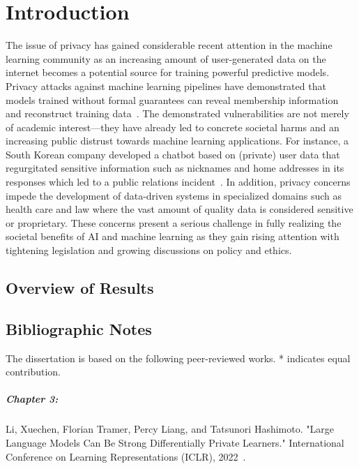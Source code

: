 \chapter{Introduction}

The issue of privacy has gained considerable recent attention in the machine learning community as an increasing amount of user-generated data on the internet becomes a potential source for training powerful predictive models.
Privacy attacks against machine learning pipelines have demonstrated that models trained without formal guarantees can reveal membership information and reconstruct training data~\cite{shokri2017membership,carlini2021extracting}.
The demonstrated vulnerabilities are not merely of academic interest---they have already led to concrete societal harms and an increasing public distrust towards machine learning applications.
For instance, a South Korean company developed a chatbot based on (private) user data that regurgitated sensitive information such as nicknames and home addresses in its responses which led to a public relations incident~\cite{sk-chatbot}.
In addition, privacy concerns impede the development of data-driven systems in specialized domains such as health care and law where the vast amount of quality data is considered sensitive or proprietary.
These concerns present a serious challenge in fully realizing the societal benefits of AI and machine learning as they gain rising attention with tightening legislation and growing discussions on policy and ethics. 

\section{Overview of Results}

\newpage
\section*{Bibliographic Notes}

The dissertation is based on the following peer-reviewed works.
* indicates equal contribution.

\paragraph{Chapter 3:} 
Li, Xuechen, Florian Tramer, Percy Liang, and Tatsunori Hashimoto. "Large Language Models Can Be Strong Differentially Private Learners." International Conference on Learning Representations (ICLR), 2022~\cite{li2021large}.


